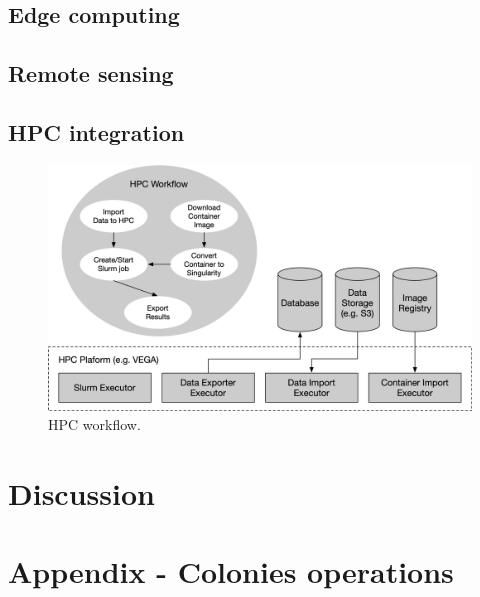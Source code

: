 \documentclass{article}
\begin{document}
\subsection{Edge computing}
\subsection{Remote sensing}
\subsection{HPC integration}

\begin{figure}[h]
	\centering
    \includegraphics[scale=0.43]{hpc_workflow.png}
	\caption{HPC workflow.}
	\label{fig:dashboard2}
\end{figure}

\section{Discussion}


 

\newpage
\appendix
\section{Appendix - Colonies operations}
\end{document}
